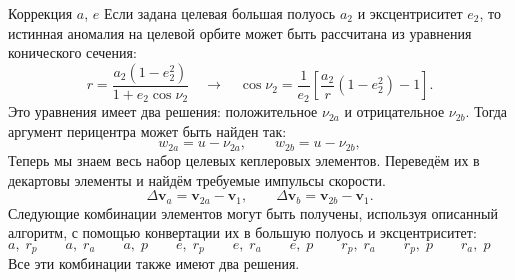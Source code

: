 \documentclass[9pt]{beamer}
\begin{document}
\begin{frame}{Коррекция $a$, $e$}
Если задана целевая большая полуось $a_2$ и эксцентриситет $e_2$, то истинная аномалия на целевой орбите может быть рассчитана из уравнения конического сечения:
\begin{equation*}
    r = \frac{a_2 (1 - e_2^2)}{1 + e_2 \cos \nu_2} \quad \longrightarrow \quad 
    \cos \nu_2 = \frac{1}{e_2} \left[ \frac{a_2}{r} (1 - e_2^2) - 1 \right].
\end{equation*}
Это уравнения имеет два решения: положительное $\nu_{2a}$ и отрицательное $\nu_{2b}$. Тогда аргумент перицентра может быть найден так:
\begin{equation*}
    w_{2a} = u - \nu_{2a}, \quad \quad w_{2b} = u - \nu_{2b},
\end{equation*}
Теперь мы знаем весь набор целевых кеплеровых элементов. Переведём их в декартовы элементы и найдём требуемые импульсы скорости.
\begin{equation*}
    \Delta \mathbf{v}_a = \mathbf{v}_{2a} - \mathbf{v}_1, \quad \quad
    \Delta \mathbf{v}_b = \mathbf{v}_{2b} - \mathbf{v}_1.
\end{equation*}
Следующие комбинации элементов могут быть получены, используя описанный алгоритм, с помощью конвертации их в большую полуось и эксцентриситет:
\begin{equation*}
 a, \; r_p \quad \quad a, \; r_a \quad \quad a, \; p \quad \quad
 e, \; r_p \quad \quad e, \; r_a \quad \quad e, \; p \quad \quad
 r_p, \; r_a \quad \quad r_p, \; p \quad \quad r_a, \; p \quad \quad
\end{equation*}
Все эти комбинации также имеют два решения.
\end{frame}
\end{document}
